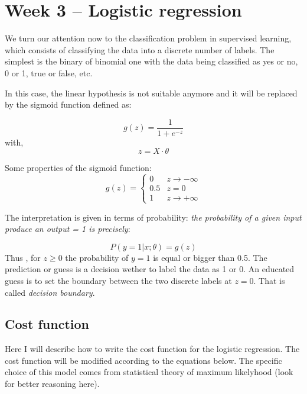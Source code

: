 \section{Week 3 -- Logistic regression}

We turn our attention now to the classification problem in supervised learning, which consists of classifying 
the data into a discrete number of labels. The simplest is the binary of binomial one with the data being classified as
yes or no, 0 or 1, true or false, etc. 

In this case, the linear hypothesis is not suitable anymore and it will be replaced by the sigmoid function defined as:

\begin{equation}
    g(z) = \frac{1}{1 + e^{-z}}
\end{equation}
with,
\begin{equation}
    z = X \cdot \theta
\end{equation}

Some properties of the sigmoid function:
\begin{equation}
    g(z) = 
        \begin{cases}
            0 &  z \rightarrow -\infty \\
            0.5 & z = 0 \\
            1 & z \rightarrow +\infty
        \end{cases}
\end{equation}

The interpretation is given in terms of probability: \textit{the probability of a given input produce an output = 1 is precisely}:

\begin{equation}
    P(y=1|x;\theta) = g(z)
\end{equation}
Thus , for $z \geqslant 0$ the probability of $y=1$ is equal or bigger than 0.5. The prediction or guess is a decision wether to 
label the data as 1 or 0. An educated guess is to set the boundary between the two discrete labels at $z=0$. That is called \textit{decision boundary}.


\subsection{Cost function}

Here I will describe how to write the cost function for the logistic regression.
The cost function will be modified according to the equations below. The specific choice of this model comes from statistical theory of maximum likelyhood (look for better reasoning here).

